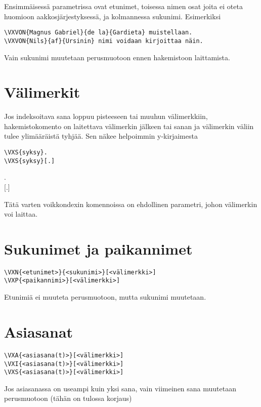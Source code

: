 \documentclass[12pt]{article}
\begin{document}
Ensimmäisessä parametrissa ovat etunimet, toisessa nimen osat joita
ei oteta huomioon aakkosjärjestyksessä, ja kolmannessa sukunimi.
Esimerkiksi

\begin{verbatim}
\VXVON{Magnus Gabriel}{de la}{Gardieta} muistellaan.
\VXVON{Nils}{af}{Ursinin} nimi voidaan kirjoittaa näin.
\end{verbatim}

Vain sukunimi muutetaan perusmuotoon ennen hakemistoon laittamista.


\section*{Välimerkit}


Jos indeksoitava sana loppuu pisteeseen tai muuhun välimerkkiin,
hakemistokomento on laitettava välimerkin jälkeen tai sanan ja
välimerkin väliin tulee ylimääräistä tyhjää. Sen näkee helpoimmin
y-kirjaimesta

\begin{verbatim}
\VXS{syksy}.
\VXS{syksy}[.]
\end{verbatim}

\noindent
{}. \\
[.]

Tätä varten voikkondexin komennoissa on ehdollinen parametri, johon
välimerkin voi laittaa.


\section*{Sukunimet ja paikannimet}

\begin{verbatim}
\VXN{<etunimet>}{<sukunimi>}[<välimerkki>]
\VXP{<paikannimi>}[<välimerkki>]
\end{verbatim}

Etunimiä ei muuteta perusmuotoon, mutta sukunimi muutetaan.


\section*{Asiasanat}

\begin{verbatim}
\VXA{<asiasana(t)>}[<välimerkki>]
\VXI{<asiasana(t)>}[<välimerkki>]
\VXS{<asiasana(t)>}[<välimerkki>]
\end{verbatim}

Jos asiasanassa on useampi kuin yksi sana, vain viimeinen sana
muutetaan perusmuotoon (tähän on tulossa korjaus)
\end{document}
